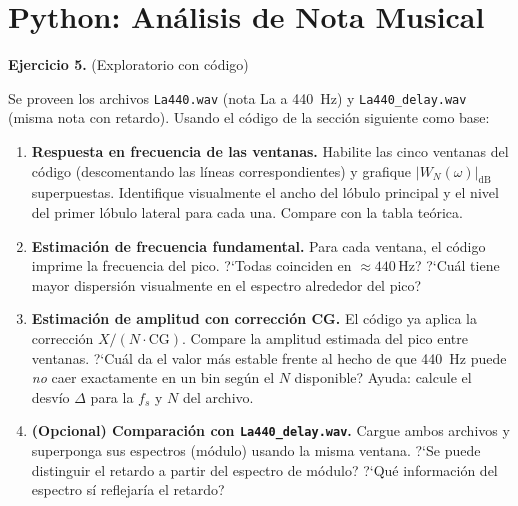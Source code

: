 \documentclass[11pt, a4paper]{article}
\begin{document}
\section{Python: An\'alisis de Nota Musical}

\begin{exbox}
\textbf{Ejercicio 5.} (Exploratorio con c\'odigo)

Se proveen los archivos \texttt{La440.wav} (nota La a 440~Hz) y
\texttt{La440\_delay.wav} (misma nota con retardo).
Usando el c\'odigo de la secci\'on siguiente como base:

\begin{enumerate}[label=\textbf{\alph*)}]

  \item \textbf{Respuesta en frecuencia de las ventanas.}
  Habilite las cinco ventanas del c\'odigo (descomentando las l\'ineas correspondientes)
  y grafique $|W_N(\omega)|_{\text{dB}}$ superpuestas.
  Identifique visualmente el ancho del l\'obulo principal y el nivel del primer
  l\'obulo lateral para cada una. Compare con la tabla te\'orica.

  \item \textbf{Estimaci\'on de frecuencia fundamental.}
  Para cada ventana, el c\'odigo imprime la frecuencia del pico.
  ?`Todas coinciden en $\approx 440\,\text{Hz}$?
  ?`Cu\'al tiene mayor dispersi\'on visualmente en el espectro alrededor del pico?

  \item \textbf{Estimaci\'on de amplitud con correcci\'on CG.}
  El c\'odigo ya aplica la correcci\'on $X / (N \cdot \text{CG})$.
  Compare la amplitud estimada del pico entre ventanas.
  ?`Cu\'al da el valor m\'as estable frente al hecho de que 440~Hz
  puede \emph{no} caer exactamente en un bin seg\'un el $N$ disponible?
  Ayuda: calcule el desvío $\Delta$ para la $f_s$ y $N$ del archivo.

  \item \textbf{(Opcional) Comparaci\'on con \texttt{La440\_delay.wav}.}
  Cargue ambos archivos y superponga sus espectros (m\'odulo) usando la misma ventana.
  ?`Se puede distinguir el retardo a partir del espectro de m\'odulo?
  ?`Qu\'e informaci\'on del espectro s\'i reflejar\'ia el retardo?

\end{enumerate}
\end{exbox}

\newpage
\end{document}
